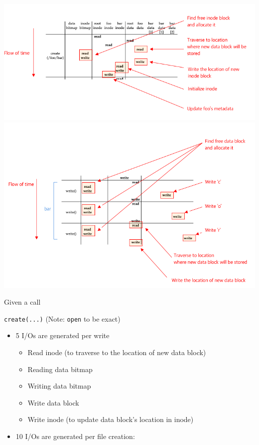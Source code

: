 \documentclass[12pt]{article}
\begin{document}
\begin{enumerate}[1.]
\begin{itemize}
        \begin{center}
        \includegraphics[width=\linewidth]{../images/midterm_4_solution_30.png}
        \includegraphics[width=\linewidth]{../images/midterm_4_solution_31.png}
        \end{center}

        \bigskip

        Given a call

        \bigskip

        \texttt{create(...)} (Note: \texttt{open} to be exact)

        \bigskip

        \begin{itemize}
            \item 5 I/Os are generated per write

            \begin{itemize}
                \item Read inode (to traverse to the location of new data block)
                \item Reading data bitmap
                \item Writing data bitmap
                \item Write data block
                \item Write inode (to update data block's location in inode)
            \end{itemize}
            \item 10 I/Os are generated per file creation:


\end{itemize}
\end{itemize}
\end{enumerate}
\end{document}
